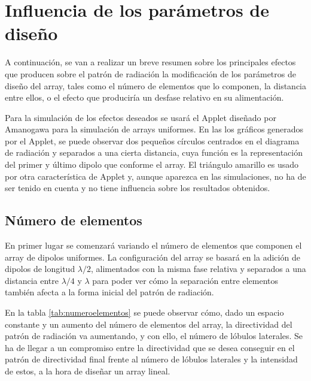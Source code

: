 \section{Influencia de los parámetros de diseño}
\par A continuación, se van a realizar un breve resumen sobre los principales efectos que producen sobre el patrón de radiación la modificación de los parámetros de diseño del array, tales como el número de elementos que lo componen, la distancia entre ellos, o el efecto que produciría un desfase relativo en su alimentación. 
\\
\par Para la simulación de los efectos deseados se usará el Applet diseñado por Amanogawa para la simulación de arrays uniformes. En las los gráficos generados por el Applet, se puede observar dos pequeños círculos centrados en el diagrama de radiación y separados a una cierta distancia, cuya función es la representación del primer y último dipolo que conforme el array. El triángulo amarillo es usado por otra característica de Applet y, aunque aparezca en las simulaciones, no ha de ser tenido en cuenta y no tiene influencia sobre los resultados obtenidos. \cite{Amanogawa2019}

\subsection{Número de elementos}
\par En primer lugar se comenzará variando el número de elementos que componen el array de dipolos uniformes. La configuración del array se basará en la adición de dipolos de longitud $\lambda/2$, alimentados con la misma fase relativa y separados a una distancia entre $\lambda/4$ y $\lambda$ para poder ver cómo la separación entre elementos también afecta a la forma inicial del patrón de radiación.
\\
\par En la tabla \ref{tab:numeroelementos} se puede observar cómo, dado un espacio constante y un aumento del número de elementos del array, la directividad del patrón de radiación va aumentando, y con ello, el número de lóbulos laterales. Se ha de llegar a un compromiso entre la directividad que se desea conseguir en el patrón de directividad final frente al número de lóbulos laterales y la intensidad de estos, a la hora de diseñar un array lineal.


